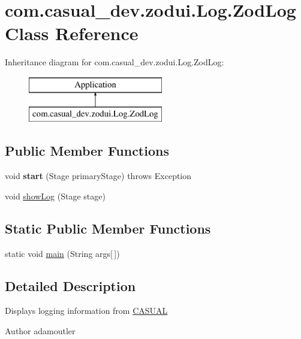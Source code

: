\hypertarget{classcom_1_1casual__dev_1_1zodui_1_1_log_1_1_zod_log}{\section{com.\-casual\-\_\-dev.\-zodui.\-Log.\-Zod\-Log Class Reference}
\label{classcom_1_1casual__dev_1_1zodui_1_1_log_1_1_zod_log}
}
Inheritance diagram for com.\-casual\-\_\-dev.\-zodui.\-Log.\-Zod\-Log\-:\begin{figure}[H]
\begin{center}
\leavevmode
\includegraphics[height=2.000000cm]{classcom_1_1casual__dev_1_1zodui_1_1_log_1_1_zod_log}
\end{center}
\end{figure}
\subsection*{Public Member Functions}
\begin{DoxyCompactItemize}
\item 
\hypertarget{classcom_1_1casual__dev_1_1zodui_1_1_log_1_1_zod_log_a68f87866ff1dd52d5f231439d77b6fba}{void {\bfseries start} (Stage primary\-Stage)  throws Exception }\label{classcom_1_1casual__dev_1_1zodui_1_1_log_1_1_zod_log_a68f87866ff1dd52d5f231439d77b6fba}

\item 
void \hyperlink{classcom_1_1casual__dev_1_1zodui_1_1_log_1_1_zod_log_a7416abab46f6883239feb2235e41b3ea}{show\-Log} (Stage stage)
\end{DoxyCompactItemize}
\subsection*{Static Public Member Functions}
\begin{DoxyCompactItemize}
\item 
static void \hyperlink{classcom_1_1casual__dev_1_1zodui_1_1_log_1_1_zod_log_ac252afd5d78a61a3aa5b8a8da7778604}{main} (String args\mbox{[}$\,$\mbox{]})
\end{DoxyCompactItemize}


\subsection{Detailed Description}
Displays logging information from \hyperlink{namespace_c_a_s_u_a_l}{C\-A\-S\-U\-A\-L} \begin{DoxyAuthor}{Author}
adamoutler 
\end{DoxyAuthor}


